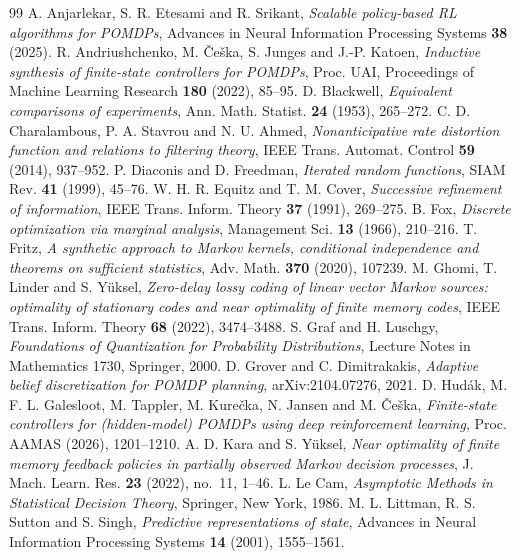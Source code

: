 \begin{thebibliography}{99}
 A. Anjarlekar, S. R. Etesami and R. Srikant, \emph{Scalable policy-based RL algorithms for POMDPs}, Advances in Neural Information Processing Systems \textbf{38} (2025).
 R. Andriushchenko, M. \v{C}e\v{s}ka, S. Junges and J.-P. Katoen, \emph{Inductive synthesis of finite-state controllers for POMDPs}, Proc. UAI, Proceedings of Machine Learning Research \textbf{180} (2022), 85--95.
 D. Blackwell, \emph{Equivalent comparisons of experiments}, Ann. Math. Statist. \textbf{24} (1953), 265--272.
 C. D. Charalambous, P. A. Stavrou and N. U. Ahmed, \emph{Nonanticipative rate distortion function and relations to filtering theory}, IEEE Trans. Automat. Control \textbf{59} (2014), 937--952.
 P. Diaconis and D. Freedman, \emph{Iterated random functions}, SIAM Rev. \textbf{41} (1999), 45--76.
 W. H. R. Equitz and T. M. Cover, \emph{Successive refinement of information}, IEEE Trans. Inform. Theory \textbf{37} (1991), 269--275.
 B. Fox, \emph{Discrete optimization via marginal analysis}, Management Sci. \textbf{13} (1966), 210--216.
 T. Fritz, \emph{A synthetic approach to Markov kernels, conditional independence and theorems on sufficient statistics}, Adv. Math. \textbf{370} (2020), 107239.
 M. Ghomi, T. Linder and S. Y\"uksel, \emph{Zero-delay lossy coding of linear vector Markov sources: optimality of stationary codes and near optimality of finite memory codes}, IEEE Trans. Inform. Theory \textbf{68} (2022), 3474--3488.
 S. Graf and H. Luschgy, \emph{Foundations of Quantization for Probability Distributions}, Lecture Notes in Mathematics 1730, Springer, 2000.
 D. Grover and C. Dimitrakakis, \emph{Adaptive belief discretization for POMDP planning}, arXiv:2104.07276, 2021.
 D. Hud\'ak, M. F. L. Galesloot, M. Tappler, M. Kure\v{c}ka, N. Jansen and M. \v{C}e\v{s}ka, \emph{Finite-state controllers for (hidden-model) POMDPs using deep reinforcement learning}, Proc. AAMAS (2026), 1201--1210.
 A. D. Kara and S. Y\"uksel, \emph{Near optimality of finite memory feedback policies in partially observed Markov decision processes}, J. Mach. Learn. Res. \textbf{23} (2022), no.~11, 1--46.
 L. Le Cam, \emph{Asymptotic Methods in Statistical Decision Theory}, Springer, New York, 1986.
 M. L. Littman, R. S. Sutton and S. Singh, \emph{Predictive representations of state}, Advances in Neural Information Processing Systems \textbf{14} (2001), 1555--1561.

\end{thebibliography}
